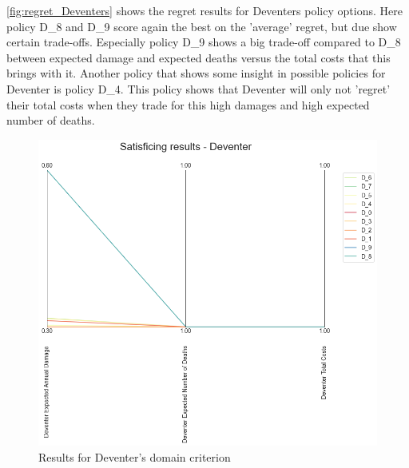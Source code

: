\noindent \autoref{fig:regret_Deventers} shows the regret results for Deventers policy options. Here policy D\_8 and D\_9 score again the best on the 'average' regret, but due show certain trade-offs. Especially policy D\_9 shows a big trade-off compared to D\_8 between expected damage and expected deaths versus the total costs that this brings with it. Another policy that shows some insight in possible policies for Deventer is policy D\_4. This policy shows that Deventer will only not 'regret' their total costs when they trade for this high damages and high expected number of deaths. 
\begin{figure}[H]
  \centering
  \begin{minipage}[b]{0.4\textwidth}
    \includegraphics[width=1.2\textwidth]{report/figures/results/domain_criterion_Deventer.png}
    \caption{Results for Deventer's domain criterion}
    \label{fig:domain_criterion_Deventers}
  \end{minipage}
  \hfill
  \begin{minipage}[b]{0.4\textwidth}

\end{minipage}
\end{figure}
